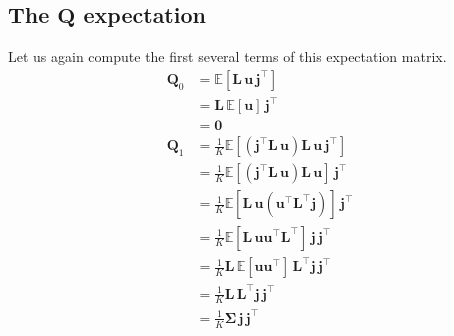 \documentclass[modern]{aastex62}
\begin{document}
    \subsection{The $\mathbf{Q}$ expectation}
    Let us again compute the first several terms of this expectation matrix.
    \begin{align}
        \mathbf{Q}_0 & = \mathbb{E}\left[ \mathbf{L} \, \mathbf{u} \, \mathbf{j}^\top \right]
        \nonumber                                                                                                                                              \\
                     & = \mathbf{L} \, \mathbb{E}\left[  \mathbf{u} \right] \, \mathbf{j}^\top
        \nonumber                                                                                                                                              \\
                     & = \mathbf{0}
        \\[1em]
        \mathbf{Q}_1 & = \frac{1}{K}\mathbb{E}\left[ \left(\mathbf{j}^\top \mathbf{L} \, \mathbf{u}\right) \mathbf{L} \, \mathbf{u} \, \mathbf{j}^\top \right]
        \nonumber                                                                                                                                              \\
                     & = \frac{1}{K}\mathbb{E}\left[ \left(\mathbf{j}^\top \mathbf{L} \, \mathbf{u}\right) \mathbf{L} \, \mathbf{u} \right] \, \mathbf{j}^\top
        \nonumber                                                                                                                                              \\
                     & = \frac{1}{K}\mathbb{E}\left[ \mathbf{L} \, \mathbf{u} (\mathbf{u}^\top \mathbf{L}^\top \mathbf{j}) \right] \, \mathbf{j}^\top
        \nonumber                                                                                                                                              \\
                     & = \frac{1}{K}\mathbb{E}\left[ \mathbf{L} \, \mathbf{u} \mathbf{u}^\top \mathbf{L}^\top  \right] \, \mathbf{j} \, \mathbf{j}^\top
        \nonumber                                                                                                                                              \\
                     & = \frac{1}{K}\mathbf{L} \, \mathbb{E}\left[  \mathbf{u} \mathbf{u}^\top   \right]  \, \mathbf{L}^\top \mathbf{j} \, \mathbf{j}^\top
        \nonumber                                                                                                                                              \\
                     & = \frac{1}{K}\mathbf{L} \, \mathbf{L}^\top \mathbf{j} \, \mathbf{j}^\top
        \nonumber                                                                                                                                              \\
                     & = \frac{1}{K}\pmb{\Sigma} \, \mathbf{j} \, \mathbf{j}^\top
    \end{align}
\end{document}
